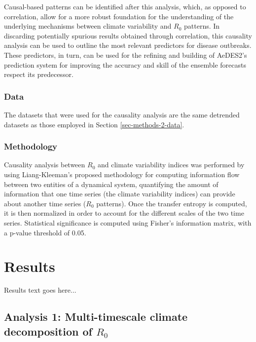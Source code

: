 \documentclass[fleqn,10pt]{wlscirep}
\begin{document}
  Causal-based patterns can be identified after this analysis, which, as opposed to correlation, allow for a more robust foundation for the understanding of the underlying mechanisms between climate variability and $R_0$ patterns. In discarding potentially spurious results obtained through correlation, this causality analysis can be used to outline the most relevant predictors for disease outbreaks. These predictors, in turn, can be used for the refining and building of AeDES2's prediction system for improving the accuracy and skill of the ensemble forecasts respect its predecessor.

  \subsubsection{Data} \label{sec-methods-3-data}

  The datasets that were used for the causality analysis are the same detrended datasets as those employed in Section \ref{sec-methods-2-data}.

  \subsubsection{Methodology} \label{sec-methods-3-methodology}

  Causality analysis between $R_0$ and climate variability indices was performed by using Liang-Kleeman's proposed methodology for computing information flow between two entities of a dynamical system, quantifying the amount of information that one time series (the climate variability indices) can provide about another time series ($R_0$ patterns). Once the transfer entropy is computed, it is then normalized in order to account for the different scales of the two time series. Statistical significance is computed using Fisher's information matrix, with a p-value threshold of 0.05.


  \section{Results}

  Results text goes here...

  \subsection{Analysis 1: Multi-timescale climate decomposition of $R_0$} \label{sec-results-1}
\end{document}
